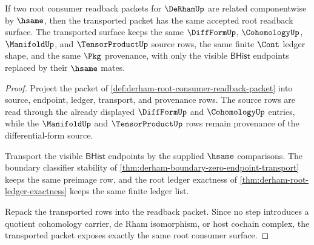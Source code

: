 \begin{theorem}
\label{thm:derham-root-consumer-readback-stability}
If two root consumer readback packets for $\DeRhamUp$ are related
componentwise by $\hsame$, then the transported packet has the same accepted
root readback surface. The transported surface keeps the same $\DiffFormUp$,
$\CohomologyUp$, $\ManifoldUp$, and $\TensorProductUp$ source rows, the same
finite $\Cont$ ledger shape, and the same $\Pkg$ provenance, with only the
visible $\mathsf{BHist}$ endpoints replaced by their $\hsame$ mates.
\end{theorem}
\begin{proof}
Project the packet of
\autoref{def:derham-root-consumer-readback-packet} into source, endpoint,
ledger, transport, and provenance rows. The source rows are read through the
already displayed $\DiffFormUp$ and $\CohomologyUp$ entries, while the
$\ManifoldUp$ and $\TensorProductUp$ rows remain provenance of the
differential-form source.

Transport the visible $\mathsf{BHist}$ endpoints by the supplied $\hsame$
comparisons. The boundary classifier stability of
\autoref{thm:derham-boundary-zero-endpoint-transport} keeps the same preimage
row, and the root ledger exactness of
\autoref{thm:derham-root-ledger-exactness} keeps the same finite ledger list.

Repack the transported rows into the readback packet. Since no step introduces
a quotient cohomology carrier, de Rham isomorphism, or host cochain complex,
the transported packet exposes exactly the same root consumer surface.
\end{proof}

